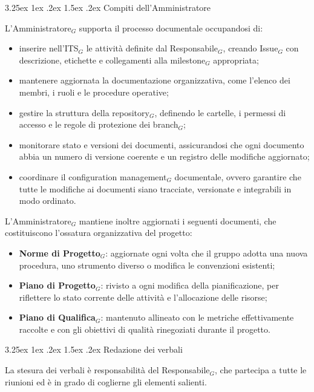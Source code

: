 \documentclass[a4paper, 10pt]{article}
\makeatletter
\renewcommand\paragraph{\@startsection{paragraph}{4}{\z@}%
  {3.25ex \@plus1ex \@minus .2ex}%
  {1.5ex \@plus .2ex}%
  {\normalfont\normalsize\bfseries}}
\makeatother
\begin{document}
\paragraph{Compiti dell'Amministratore}

L'Amministratore$_G$ supporta il processo documentale occupandosi di:
\begin{itemize}
    \item inserire nell'ITS$_G$ le attività definite dal Responsabile$_G$, creando Issue$_G$ con descrizione, etichette e collegamenti alla milestone$_G$ appropriata;
    \item mantenere aggiornata la documentazione organizzativa, come l'elenco dei membri, i ruoli e le procedure operative;
    \item gestire la struttura della repository$_G$, definendo le cartelle, i permessi di accesso e le regole di protezione dei branch$_G$;
    \item monitorare stato e versioni dei documenti, assicurandosi che ogni documento abbia un numero di versione coerente e un registro delle modifiche aggiornato;
    \item coordinare il configuration management$_G$ documentale, ovvero garantire che tutte le modifiche ai documenti siano tracciate, versionate e integrabili in modo ordinato.
\end{itemize}

L'Amministratore$_G$ mantiene inoltre aggiornati i seguenti documenti, che costituiscono l'ossatura organizzativa del progetto:
\begin{itemize}
    \item \textbf{Norme di Progetto$_G$}: aggiornate ogni volta che il gruppo adotta una nuova procedura, uno strumento diverso o modifica le convenzioni esistenti;
    \item \textbf{Piano di Progetto$_G$}: rivisto a ogni modifica della pianificazione, per riflettere lo stato corrente delle attività e l'allocazione delle risorse;
    \item \textbf{Piano di Qualifica$_G$}: mantenuto allineato con le metriche effettivamente raccolte e con gli obiettivi di qualità rinegoziati durante il progetto.
\end{itemize}

\paragraph{Redazione dei verbali}

La stesura dei verbali è responsabilità del Responsabile$_G$, che partecipa a tutte le riunioni ed è in grado di coglierne gli elementi salienti.
\end{document}

